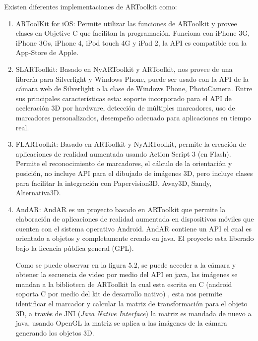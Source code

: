 \documentclass[12pt,a4paper,spanish,openany]{book}
\begin{document}
Existen diferentes implementaciones de ARToolkit como:
\begin{enumerate}
  \item ARToolKit for iOS: Permite utilizar las funciones de ARToolkit y
  provee clases en Objetive C que facilitan la programación. Funciona con
  iPhone 3G, iPhone 3Gs, iPhone 4, iPod touch 4G y iPad 2, la API es
  compatible con la App-Store de Apple. \cite{artoolkitios} 
  
  \item SLARToolkit: Basado en NyARToolkit y ARToolkit, nos provee de una
  librería para Silverlight y Windows Phone, puede ser usado con la API de la
  cámara web de Silverlight  o la clase de Windows Phone, PhotoCamera. Entre sus
  principales características esta: soporte incorporado para el API de
  aceleración 3D por hardware, detección de múltiples marcadores, uso de
  marcadores personalizados, desempeño adecuado para aplicaciones en tiempo real.
  \cite{slartoolkit}

  
  \item FLARToolkit: Basado en ARToolkit y NyARToolkit, permite la creación de
  aplicaciones de realidad aumentada usando Action Script 3 (en Flash). Permite
  el reconocimiento de marcadores, el cálculo de la orientación y posición, no
  incluye API para el dibujado de imágenes 3D, pero incluye clases para
  facilitar la integración con Papervision3D, Away3D, Sandy,
  Alternativa3D. \cite{flartoolkit}
 
  \item AndAR: AndAR es un proyecto basado en ARToolkit que permite la
  elaboración de aplicaciones de realidad aumentada en dispositivos móviles que cuenten con el
sistema operativo Android. AndAR contiene un API el cual es orientado a objetos
y completamente creado en java. El proyecto esta liberado bajo la licencia
pública general (GPL).
\cite{pandar}

Como se puede observar en la figura 5.2, se puede acceder a la cámara y obtener
la secuencia de video por medio del API en java, las imágenes se mandan a la
biblioteca de ARToolkit la cual esta escrita en C (android soporta C por medio
del kit de desarrollo nativo) , esta nos permite identificar el marcador y
calcular la matriz de transformación para el objeto 3D, a través de JNI
(\emph{Java Native Interface}) la matriz es mandada de nuevo a java, usando
OpenGL la matriz se aplica a las imágenes de la cámara generando los objetos 3D.\cite{aroasf}


\end{enumerate}
\end{document}
